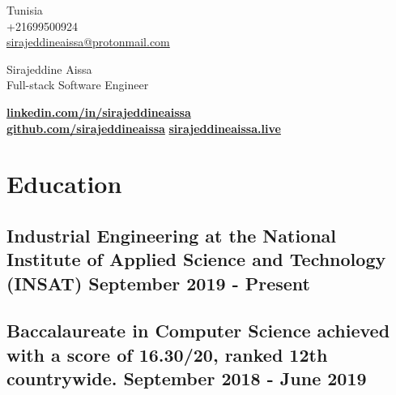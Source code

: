 \documentclass[a4,10pt]{article}
\begin{document}
\begin{center}
    \begin{minipage}[b]{0.24\textwidth}
            \large Tunisia \\
            \large +21699500924 \\
            \large \href{mailto:sirajeddineaissa@protonmail.com}{sirajeddineaissa@protonmail.com} 
    \end{minipage}%
    \begin{minipage}[b]{0.5\textwidth}
            \centering
            {\HUGE Sirajeddine Aissa} \\ %
            \vspace{0.1cm}
            {\color{UI_blue} \Large{Full-stack Software Engineer}} \\
    \end{minipage}%
    \begin{minipage}[b]{0.24\textwidth}
            \flushright \large  %
            {\href{https://www.linkedin.com/in/sirajeddineaissa}{\small \textbf {linkedin.com/in/sirajeddineaissa}} } \\
            \href{https://github.com/sirajeddineaissa}{\small \textbf {github.com/sirajeddineaissa}}
             \href{https://sirajeddineaissa.live}{\small \textbf {sirajeddineaissa.live}}
    \end{minipage}   
    
\vspace{-0.15cm} 
\end{center}


\section{Education }
\subsection*{Industrial Engineering {\normalsize \normalfont   at the National Institute of Applied Science and Technology (INSAT)} \hfill September 2019 - Present} 
\vspace{0.1cm}
\subsection*{Baccalaureate in Computer Science {\normalsize \normalfont   achieved with a score of 16.30/20, ranked 12th countrywide. } \hfill September 2018 - June 2019} 
\vspace{0.2cm}
\end{document}
